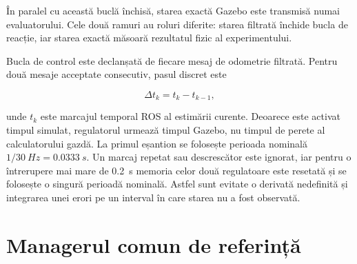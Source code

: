\documentclass[12pt,a4paper,oneside]{report}
\begin{document}
\begin{center}
\end{center}

În paralel cu această buclă închisă, starea exactă Gazebo este transmisă numai
evaluatorului. Cele două ramuri au roluri diferite: starea filtrată închide
bucla de reacție, iar starea exactă măsoară rezultatul fizic al experimentului.

Bucla de control este declanșată de fiecare mesaj de odometrie filtrată. Pentru
două mesaje acceptate consecutiv, pasul discret este

\begin{equation}
  \Delta t_k=t_k-t_{k-1},
\end{equation}

unde $t_k$ este marcajul temporal ROS al estimării curente. Deoarece este
activat timpul simulat, regulatorul urmează timpul Gazebo, nu timpul de perete
al calculatorului gazdă. La primul eșantion se folosește perioada nominală
$1/\SI{30}{Hz}=\SI{0.0333}{s}$. Un marcaj repetat sau descrescător este ignorat,
iar pentru o întrerupere mai mare de \SI{0.2}{s} memoria celor două regulatoare
este resetată și se folosește o singură perioadă nominală. Astfel sunt evitate
o derivată nedefinită și integrarea unei erori pe un interval în care starea nu
a fost observată.

\chapter{Managerul comun de referință}
\end{document}
